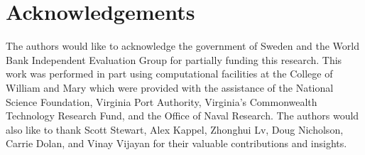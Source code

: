 \documentclass{article}\usepackage[]{graphicx}\usepackage[]{color}
\newenvironment{knitrout}{}{}  %
\begin{document}
\begin{knitrout}
\section{Acknowledgements}
The authors would like to acknowledge the government of Sweden and the World Bank Independent Evaluation Group for partially funding this research.  
This work was performed in part using computational facilities at the College of William and Mary which were provided with the assistance of the National Science Foundation, Virginia Port Authority, Virginia's Commonwealth Technology Research Fund, and the Office of Naval Research.  
The authors would also like to thank Scott Stewart, Alex Kappel, Zhonghui Lv, Doug Nicholson, Carrie Dolan, and Vinay Vijayan for their valuable contributions and insights.


\newpage
\printbibliography



\end{knitrout}
\end{document}
